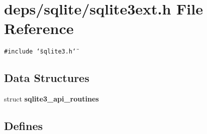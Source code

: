 \section{deps/sqlite/sqlite3ext.h File Reference}
\label{sqlite3ext_8h}
{\tt \#include \char`\"{}sqlite3.h\char`\"{}}\par
\subsection*{Data Structures}
\begin{CompactItemize}
\item 
struct \bf{sqlite3\_\-api\_\-routines}
\end{CompactItemize}
\subsection*{Defines}
